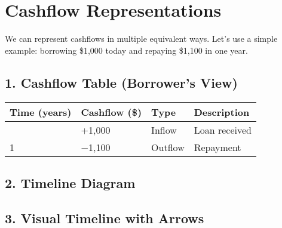\documentclass[
  letterpaper,
]{scrbook}
\begin{document}
\section{Cashflow Representations}\label{cashflow-representations}

We can represent cashflows in multiple equivalent ways. Let's use a
simple example: borrowing \$1,000 today and repaying \$1,100 in one
year.

\subsection{1. Cashflow Table (Borrower's
View)}\label{cashflow-table-borrowers-view}

\begin{longtable}[]{@{}llll@{}}
\toprule\noalign{}
Time (years) & Cashflow (\$) & Type & Description \\
\midrule\noalign{}
\endhead
\bottomrule\noalign{}
\endlastfoot
0 & +1,000 & Inflow & Loan received \\
1 & −1,100 & Outflow & Repayment \\
\end{longtable}

\subsection{2. Timeline Diagram}\label{timeline-diagram}

\begin{figure}[h]
\centering
{}
\end{figure}

\subsection{3. Visual Timeline with
Arrows}\label{visual-timeline-with-arrows}
\end{document}
